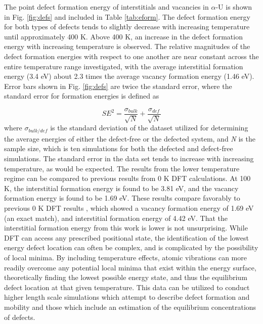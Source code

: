 \documentclass[utf8]{frontiersSCNS} %
\begin{document}
The point defect formation energy of interstitials and vacancies in $\alpha$-U is shown in Fig. \ref{fig:defs} and included in Table \ref{tab:eform}. The defect formation energy for both types of defects tends to slightly decrease with increasing temperature until approximately 400 K. Above 400 K, an increase in the defect formation energy with increasing temperature is observed. The relative magnitudes of the defect formation energies with respect to one another are near constant across the entire temperature range investigated, with the average interstitial formation energy (3.4 eV) about 2.3 times the average vacancy formation energy (1.46 eV). Error bars shown in Fig. \ref{fig:defs} are twice the standard error, where the standard error for formation energies is defined as 

\begin{equation}
\label{eq:surf}
SE^2 = \frac{\sigma_{bulk}}{\sqrt{N}} + \frac{\sigma_{def}}{\sqrt{N}}
\end{equation}where $\sigma_{bulk/def}$ is the standard deviation of the dataset utilized for determining the average energies of either the defect-free or the defected system, and \textit{N} is the sample size, which is ten simulations for both the defected and defect-free simulations. The standard error in the data set tends to increase with increasing temperature, as would be expected. The results from the lower temperature regime can be compared to previous results from 0 K DFT calculations. At 100 K, the interstitial formation energy is found to be 3.81 eV, and the vacancy formation energy is found to be 1.69 eV. These results compare favorably to previous 0 K DFT results \cite{wirth2011}, which showed a vacancy formation energy of 1.69 eV (an exact match), and interstitial formation energy of 4.42 eV. That the interstitial formation energy from this work is lower is not unsurprising. While DFT can access any prescribed positional state, the identification of the lowest energy defect location can often be complex, and is complicated by the possibility of local minima. By including temperature effects, atomic vibrations can more readily overcome any potential local minima that exist within the energy surface, theoretically finding the lowest possible energy state, and thus the equilibrium defect location at that given temperature. This data can be utilized to conduct higher length scale simulations which attempt to describe defect formation and mobility and those which include an estimation of the equilibrium concentrations of defects. 
 
\end{document}
